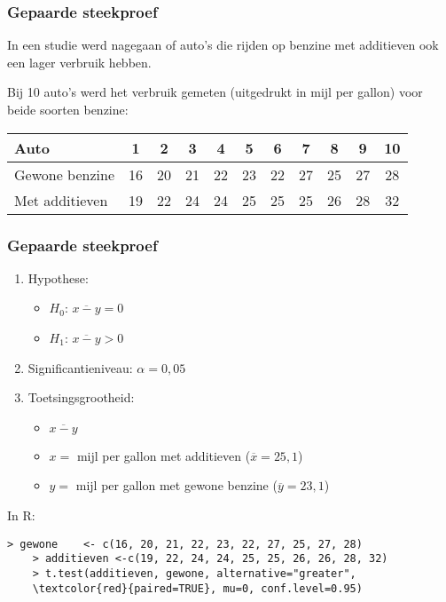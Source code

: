 \documentclass[aspectratio=169]{beamer}
\begin{document}
\begin{frame}
  \frametitle{Gepaarde steekproef}

  In een studie werd nagegaan of auto's die rijden op benzine met additieven ook een lager verbruik hebben.

  Bij 10 auto's werd het verbruik gemeten (uitgedrukt in mijl per gallon) voor beide soorten benzine:

  \vspace{.5cm}
  \centering
  \begin{tabular}{|l|c|c|c|c|c|c|c|c|c|c|}
    \hline
    Auto           & 1  & 2  & 3  & 4  & 5  & 6  & 7  & 8  & 9  & 10 \\ \hline
    Gewone benzine & 16 & 20 & 21 & 22 & 23 & 22 & 27 & 25 & 27 & 28 \\ \hline
    Met additieven & 19 & 22 & 24 & 24 & 25 & 25 & 25 & 26 & 28 & 32 \\ \hline
  \end{tabular}
\end{frame}

\begin{frame}[fragile]
  \frametitle{Gepaarde steekproef}
  \begin{enumerate}
    \item Hypothese:
    \begin{itemize}
      \item $H_0$: $\overline{x-y} = 0$
      \item $H_1$: $\overline{x-y} > 0$
    \end{itemize}
    \item Significantieniveau: $\alpha = 0,05$
    \item Toetsingsgrootheid:
    \begin{itemize}
      \item $\overline{x-y}$
      \item $x =$ mijl per gallon met additieven ($\overline{x}=25,1$)
      \item $y =$ mijl per gallon met gewone benzine ($\overline{y}=23,1$)
    \end{itemize}
  \end{enumerate}
  \vfill
  In R:
  {\footnotesize
    \begin{Verbatim}[commandchars=\\\{\}]
    > gewone    <- c(16, 20, 21, 22, 23, 22, 27, 25, 27, 28)
    > additieven <-c(19, 22, 24, 24, 25, 25, 26, 26, 28, 32)
    > t.test(additieven, gewone, alternative="greater",
    \textcolor{red}{paired=TRUE}, mu=0, conf.level=0.95)
    \end{Verbatim}
  }
\end{frame}
\end{document}
